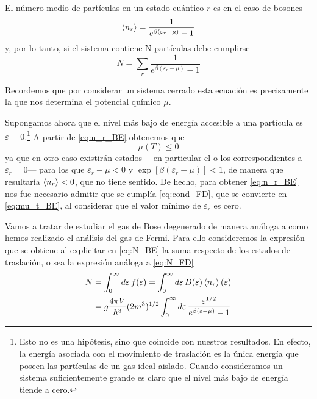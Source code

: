 El número medio de partículas en un estado cuántico $r$ es en el caso de bosones
\begin{equation}\label{eq:n_r_BE}
	\expval{n_r} = \frac{1}{e^{\beta(\varepsilon_r -\mu)} - 1}
\end{equation}
y, por lo tanto, si el sistema contiene N partículas debe cumplirse
\begin{equation}\label{eq:N_BE}
	N = \sum_r \frac{1}{e^{\beta(\varepsilon_r -\mu)} - 1}
\end{equation}

Recordemos que por considerar un sistema cerrado esta ecuación es precisamente la que nos determina el potencial químico $\mu$.

Supongamos ahora que el nivel más bajo de energía accesible a una partícula es $\varepsilon = 0$.\footnote{Esto no es una hipótesis, sino que coincide con nuestros resultados. En efecto, la energía asociada con el movimiento de traslación es la única energía que poseen las partículas de un gas ideal aislado. Cuando consideramos un sistema suficientemente grande es claro que el nivel más bajo de energía tiende a cero.}
A partir de \eqref{eq:n_r_BE} obtenemos que
\begin{equation}\label{eq:mu_t_BE}
	\mu(T) \leq 0
\end{equation}
ya que en otro caso existirán estados ---en particular el o los correspondientes a $\varepsilon_r = 0$--- para los que $\varepsilon_r -\mu < 0$ y $\exp[\beta(\varepsilon_r -\mu)] < 1$, de manera que resultaría $\expval{n_r} < 0$, que no tiene sentido.
De hecho, para obtener \eqref{eq:n_r_BE} nos fue necesario admitir que se cumplía \eqref{eq:cond_FD}, que se convierte en \eqref{eq:mu_t_BE}, al considerar que el valor mínimo de $\varepsilon_r$ es cero.

Vamos a tratar de estudiar el gas de Bose degenerado de manera análoga a como hemos realizado el análisis del gas de Fermi.
Para ello consideremos la expresión que se obtiene al explicitar en \eqref{eq:N_BE} la suma respecto de los estados de traslación, o sea la expresión análoga a \eqref{eq:N_FD}
\begin{align}\label{eq:N_2_BE}
	N &= \int_0^{\infty} \dd{\varepsilon} f(\varepsilon) = \int_0^{\infty} \dd{\varepsilon} D(\varepsilon) \expval{n_r}(\varepsilon) \nonumber \\
	&= g \frac{4\pi V}{h^3} (2m^3)^{1/2} \int_0^{\infty} \dd{\varepsilon} \frac{\varepsilon^{1/2}}{e^{\beta(\varepsilon -\mu)} - 1}
\end{align}

